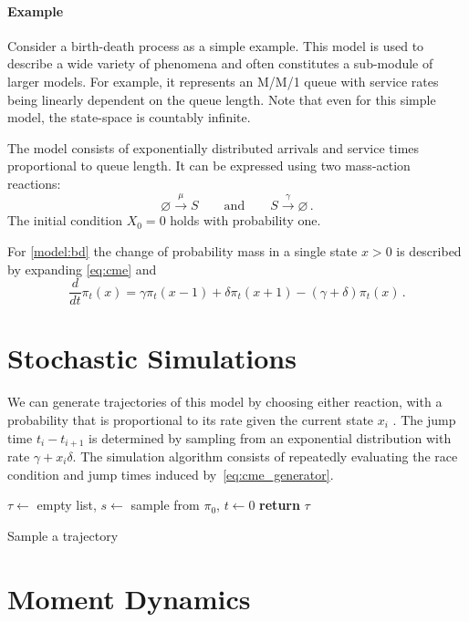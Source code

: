 \paragraph{Example} Consider a birth-death process as a simple example. This model is used to describe a wide variety of phenomena and often constitutes a sub-module of larger models.
For example, it represents an M/M/1 queue with service rates being linearly dependent on the queue length.
Note that even for this simple model, the state-space is countably infinite.
\begin{model}\label{model:bd}
The model consists of exponentially distributed arrivals and service times proportional to queue length. It can be expressed using two mass-action reactions:
$$ \varnothing \xrightarrow{\mu} S \qquad\text{and}\qquad S \xrightarrow{\gamma} \varnothing\,.$$
The initial condition $X_0=0$ holds with probability one.
\end{model}

For \autoref{model:bd} the change of probability mass in a single state $x>0$ is described by expanding
\eqref{eq:cme} and
$$\frac{d}{dt}\pi_t(x)=\gamma \pi_t(x-1) + \delta \pi_t(x+1) - (\gamma + \delta)\pi_t(x)\,.$$

\section{Stochastic Simulations}
We can generate trajectories of this model by choosing either reaction, with a probability that is
proportional to its rate given the current state $x_i$ \cite{gillespie1977exact}.
The jump time $t_i- t_{i+1}$ is determined by sampling from an exponential distribution with rate $\gamma+x_i\delta$.
The simulation algorithm consists of repeatedly evaluating the race condition and jump times induced by~\eqref{eq:cme_generator}.
\begin{algorithm}
    $\tau \leftarrow$ empty list, $s\leftarrow$ sample from $\pi_0$, $t\leftarrow 0$\;
    \textbf{return} $\tau$\;
    \caption{\label{alg:ssa}Sample a trajectory}
\end{algorithm}


\section{Moment Dynamics}\label{sec:moments_bg}
